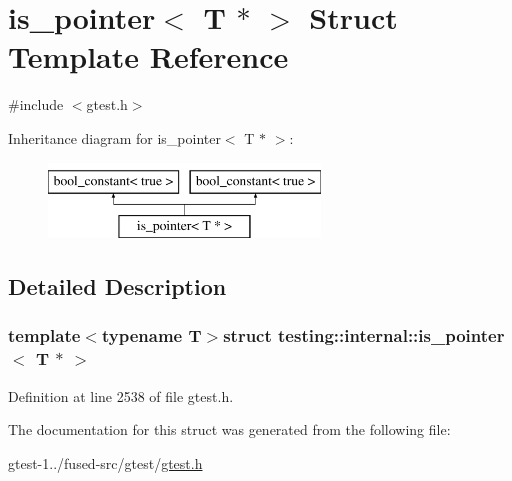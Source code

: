 \hypertarget{structtesting_1_1internal_1_1is__pointer_3_01T_01_5_01_4}{\section{is\-\_\-pointer$<$ \-T $\ast$ $>$ \-Struct \-Template \-Reference}
\label{dc/d5b/structtesting_1_1internal_1_1is__pointer_3_01T_01_5_01_4}
}


{\ttfamily \#include $<$gtest.\-h$>$}

\-Inheritance diagram for is\-\_\-pointer$<$ \-T $\ast$ $>$\-:\begin{figure}[H]
\begin{center}
\leavevmode
\includegraphics[height=2.000000cm]{dc/d5b/structtesting_1_1internal_1_1is__pointer_3_01T_01_5_01_4}
\end{center}
\end{figure}


\subsection{\-Detailed \-Description}
\subsubsection*{template$<$typename T$>$struct testing\-::internal\-::is\-\_\-pointer$<$ T $\ast$ $>$}



\-Definition at line 2538 of file gtest.\-h.



\-The documentation for this struct was generated from the following file\-:\begin{DoxyCompactItemize}
\item 
gtest-\/1../fused-\/src/gtest/\hyperlink{fused-src_2gtest_2gtest_8h}{gtest.\-h}\end{DoxyCompactItemize}
